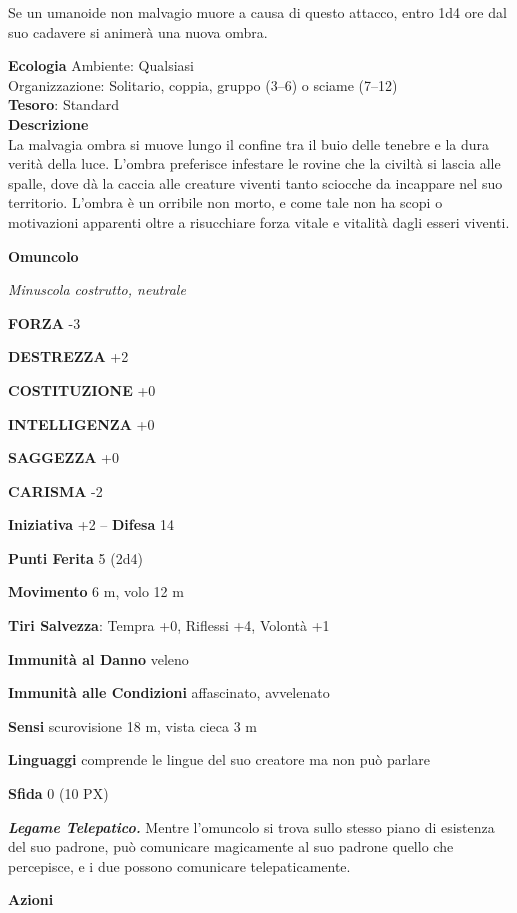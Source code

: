 \begin{multicols}{2}
Se un umanoide non malvagio muore a causa di questo attacco, entro 1d4 ore dal suo cadavere si animerà una nuova ombra.

\textbf{Ecologia}
Ambiente: Qualsiasi\\
Organizzazione: Solitario, coppia, gruppo (3–6) o sciame (7–12)\\
\textbf{Tesoro}: Standard\\

\textbf{Descrizione}\\
La malvagia ombra si muove lungo il confine tra il buio delle tenebre e la dura verità della luce. L’ombra preferisce infestare le rovine che la civiltà si lascia alle spalle, dove dà la caccia alle creature viventi tanto sciocche da incappare nel suo territorio. L’ombra è un orribile non morto, e come tale non ha scopi o motivazioni apparenti oltre a risucchiare forza vitale e vitalità dagli esseri viventi.


\medskip{}\textbf{Omuncolo}

\textit{Minuscola costrutto, neutrale}

\textbf{FORZA} -3

\textbf{DESTREZZA} +2

\textbf{COSTITUZIONE} +0

\textbf{INTELLIGENZA} +0

\textbf{SAGGEZZA} +0

\textbf{CARISMA} -2

\textbf{Iniziativa} +2 -- \textbf{Difesa} 14

\textbf{Punti Ferita} 5 (2d4)

\textbf{Movimento} 6 m, volo 12 m

\textbf{Tiri Salvezza}: Tempra +0, Riflessi +4, Volontà +1

\textbf{Immunità al Danno} veleno

\textbf{Immunità alle Condizioni} affascinato, avvelenato

\textbf{Sensi} scurovisione 18 m, vista cieca 3 m

\textbf{Linguaggi} comprende le lingue del suo creatore ma non può parlare

\textbf{Sfida} 0 (10 PX)

\textit{\textbf{Legame Telepatico.}} Mentre l'omuncolo si trova sullo stesso piano di esistenza del suo padrone, può comunicare magicamente al suo padrone quello che percepisce, e i due possono comunicare telepaticamente.

\textbf{Azioni}


\end{multicols}
